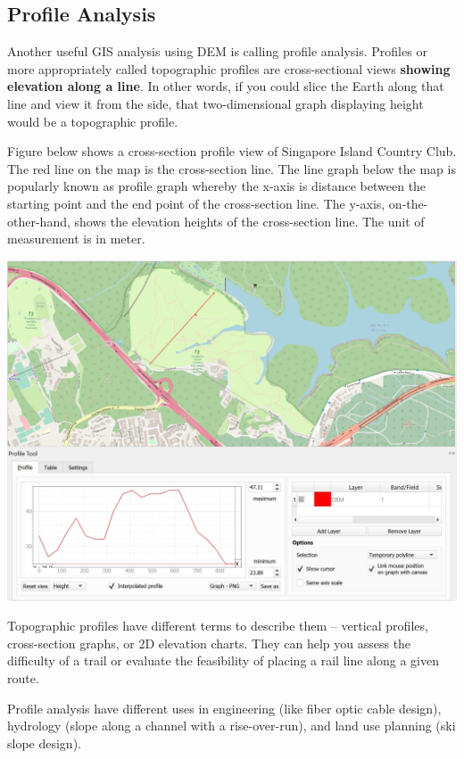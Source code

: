 \documentclass[
  letterpaper,
  DIV=11,
  numbers=noendperiod]{scrreprt}
\begin{document}
\hypertarget{profile-analysis}{%
\subsection{Profile Analysis}\label{profile-analysis}}

Another useful GIS analysis using DEM is calling profile analysis.
Profiles or more appropriately called topographic profiles are
cross-sectional views \textbf{showing elevation along a line}. In other
words, if you could slice the Earth along that line and view it from the
side, that two-dimensional graph displaying height would be a
topographic profile.

Figure below shows a cross-section profile view of Singapore Island
Country Club. The red line on the map is the cross-section line. The
line graph below the map is popularly known as profile graph whereby the
x-axis is distance between the starting point and the end point of the
cross-section line. The y-axis, on-the-other-hand, shows the elevation
heights of the cross-section line. The unit of measurement is in meter.

\includegraphics{./img06/image66.jpg}

Topographic profiles have different terms to describe them -- vertical
profiles, cross-section graphs, or 2D elevation charts. They can help
you assess the difficulty of a trail or evaluate the feasibility of
placing a rail line along a given route.

Profile analysis have different uses in engineering (like fiber optic
cable design), hydrology (slope along a channel with a rise-over-run),
and land use planning (ski slope design).
\end{document}
